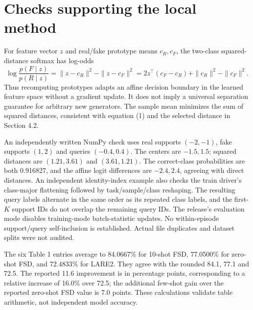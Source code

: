 \documentclass[10pt]{article}
\begin{document}
\section*{Checks supporting the local method}
For feature vector \(z\) and real/fake prototype means \(c_R,c_F\), the two-class squared-distance softmax has log-odds \[\log\frac{p(F\mid z)}{p(R\mid z)}
 =\|z-c_R\|^2-\|z-c_F\|^2
 =2z^\top(c_F-c_R)+\|c_R\|^2-\|c_F\|^2.\] Thus recomputing prototypes adapts an affine decision boundary in the learned feature space without a gradient update. It does not imply a universal separation guarantee for arbitrary new generators. The sample mean minimizes the sum of squared distances, consistent with equation (1) and the selected distance in Section 4.2.\par
An independently written NumPy check uses real supports \((-2,-1)\), fake supports \((1,2)\) and queries \((-0.4,0.4)\). The centers are \(-1.5,1.5\); squared distances are \((1.21,3.61)\) and \((3.61,1.21)\). The correct-class probabilities are both 0.916827, and the affine logit differences are \(-2.4,2.4\), agreeing with direct distances. An independent identity-index example also checks the train driver’s class-major flattening followed by task/sample/class reshaping. The resulting query labels alternate in the same order as its repeated class labels, and the first-\(K\) support IDs do not overlap the remaining query IDs. The release’s evaluation mode disables training-mode batch-statistic updates. No within-episode support/query self-inclusion is established. Actual file duplicates and dataset splits were not audited.\par
The six Table 1 entries average to 84.0667\% for 10-shot FSD, 77.0500\% for zero-shot FSD, and 72.4833\% for LARE2. They agree with the rounded 84.1, 77.1 and 72.5. The reported 11.6 improvement is in percentage points, corresponding to a relative increase of 16.0\% over 72.5; the additional few-shot gain over the reported zero-shot FSD value is 7.0 points. These calculations validate table arithmetic, not independent model accuracy.\par
\end{document}
